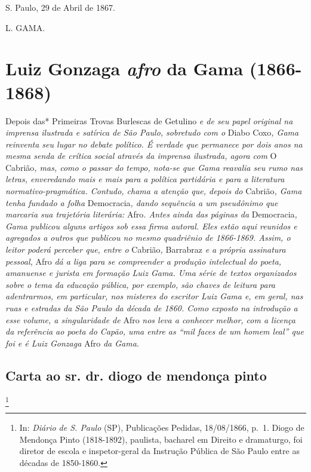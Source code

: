 S. Paulo, 29 de Abril de 1867.

L. GAMA.

\part{Luiz Gonzaga \emph{afro} da Gama (1866-1868)}

\begin{didascalia}
Depois das* Primeiras Trovas Burlescas de Getulino \emph{e de seu papel
original na imprensa ilustrada e satírica de São Paulo, sobretudo com o}
Diabo Coxo\emph{, Gama reinventa seu lugar no debate político. É verdade
que permanece por dois anos na mesma senda de crítica social através da
imprensa ilustrada, agora com} O Cabrião\emph{, mas, como o passar do
tempo, nota-se que Gama reavalia seu rumo nas letras, enveredando mais e
mais para a política partidária e para a literatura
normativo-pragmática. Contudo, chama a atenção que, depois do}
Cabrião\emph{, Gama tenha fundado a folha} Democracia\emph{, dando
sequência a um pseudônimo que marcaria sua trajetória literária:}
Afro\emph{. Antes ainda das páginas da} Democracia\emph{, Gama publicou
alguns artigos sob essa firma autoral. Eles estão aqui reunidos e
agregados a outros que publicou no mesmo quadriênio de 1866-1869. Assim,
o leitor poderá perceber que, entre o} Cabrião\emph{,} Barrabraz \emph{e
a própria assinatura pessoal,} Afro \emph{dá a liga para se compreender
a produção intelectual do poeta, amanuense e jurista em formação Luiz
Gama. Uma série de textos organizados sobre o tema da educação pública,
por exemplo, são chaves de leitura para adentrarmos, em particular, nos
misteres do escritor Luiz Gama e, em geral, nas ruas e estradas da São
Paulo da década de 1860. Como exposto na introdução a esse volume, a
singularidade de} Afro \emph{nos leva a conhecer melhor, com a licença
da referência ao poeta do Capão, uma entre as ``mil faces de um homem
leal'' que foi e é Luiz Gonzaga} Afro \emph{da Gama.}
\end{didascalia}

\chapter{Carta ao sr. dr. diogo de mendonça pinto}\footnote{In: \emph{Diário
  de S. Paulo} (SP), Publicações Pedidas, 18/08/1866, p.~1. Diogo de
  Mendonça Pinto (1818-1892), paulista, bacharel em Direito e
  dramaturgo, foi diretor de escola e inspetor-geral da Instrução
  Pública de São Paulo entre as décadas de 1850-1860.}

